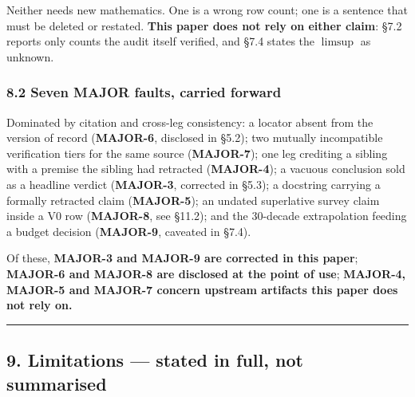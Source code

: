 \documentclass[
  a4paper,
  11pt]{article}
\begin{document}
Neither needs new mathematics. One is a wrong row count; one is a
sentence that must be deleted or restated. \textbf{This paper does not
rely on either claim}: §7.2 reports only counts the audit itself
verified, and §7.4 states the \(\limsup\) as unknown.

\subsubsection{8.2 Seven MAJOR faults, carried
forward}\label{82-seven-major-faults-carried-forward}

Dominated by citation and cross-leg consistency: a locator absent from
the version of record (\textbf{MAJOR-6}, disclosed in §5.2); two
mutually incompatible verification tiers for the same source
(\textbf{MAJOR-7}); one leg crediting a sibling with a premise the
sibling had retracted (\textbf{MAJOR-4}); a vacuous conclusion sold as a
headline verdict (\textbf{MAJOR-3}, corrected in §5.3); a docstring
carrying a formally retracted claim (\textbf{MAJOR-5}); an undated
superlative survey claim inside a V0 row (\textbf{MAJOR-8}, see §11.2);
and the 30-decade extrapolation feeding a budget decision
(\textbf{MAJOR-9}, caveated in §7.4).

Of these, \textbf{MAJOR-3 and MAJOR-9 are corrected in this paper};
\textbf{MAJOR-6 and MAJOR-8 are disclosed at the point of use};
\textbf{MAJOR-4, MAJOR-5 and MAJOR-7 concern upstream artifacts this
paper does not rely on.}

\begin{center}\rule{0.5\linewidth}{0.5pt}\end{center}

\subsection{9. Limitations --- stated in full, not
summarised}\label{9-limitations--stated-in-full-not-summarised}
\end{document}
